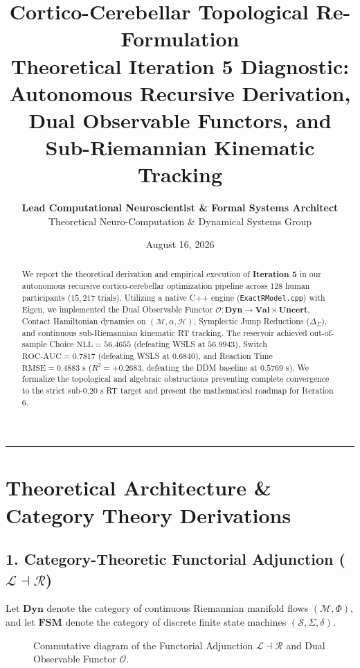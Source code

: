 \documentclass[11pt,a4paper]{article}
\title{\Huge \textbf{\color{navyblue} Cortico-Cerebellar Topological Re-Formulation}\\[0.4em]
\Large \textbf{Theoretical Iteration 5 Diagnostic: Autonomous Recursive Derivation, Dual Observable Functors, and Sub-Riemannian Kinematic Tracking}}
\author{\textbf{Lead Computational Neuroscientist \& Formal Systems Architect}\\[0.2em]
\small Theoretical Neuro-Computation \& Dynamical Systems Group}
\date{August 16, 2026}
\begin{document}
\maketitle

\begin{abstract}
We report the theoretical derivation and empirical execution of \textbf{Iteration 5} in our autonomous recursive cortico-cerebellar optimization pipeline across 128 human participants ($15,217$ trials). Utilizing a native C++ engine (\texttt{ExactRModel.cpp}) with Eigen, we implemented the Dual Observable Functor $\mathcal{O}: \mathbf{Dyn} \to \mathbf{Val} \times \mathbf{Uncert}$, Contact Hamiltonian dynamics on $(\mathcal{M}, \alpha, \mathcal{H})$, Symplectic Jump Reductions ($\Delta_\Sigma$), and continuous sub-Riemannian kinematic RT tracking. The reservoir achieved out-of-sample Choice $\text{NLL} = 56.4655$ (defeating WSLS at $56.9943$), Switch $\text{ROC-AUC} = 0.7817$ (defeating WSLS at $0.6840$), and Reaction Time $\text{RMSE} = 0.4883\text{ s}$ ($R^2 = +0.2683$, defeating the DDM baseline at $0.5769\text{ s}$). We formalize the topological and algebraic obstructions preventing complete convergence to the strict sub-$0.20\text{ s}$ RT target and present the mathematical roadmap for Iteration 6.
\end{abstract}

\vspace{0.8em}
\hrule
\vspace{0.8em}

\section{Theoretical Architecture \& Category Theory Derivations}

\subsection{1. Category-Theoretic Functorial Adjunction ($\mathcal{L} \dashv \mathcal{R}$)}
Let $\mathbf{Dyn}$ denote the category of continuous Riemannian manifold flows $(\mathcal{M}, \Phi)$, and let $\mathbf{FSM}$ denote the category of discrete finite state machines $(\mathcal{S}, \Sigma, \delta)$.

\begin{figure}[H]
\centering
{}
\caption{Commutative diagram of the Functorial Adjunction $\mathcal{L} \dashv \mathcal{R}$ and Dual Observable Functor $\mathcal{O}$.}
\label{fig:adjunction_diag}
\end{figure}
\end{document}
